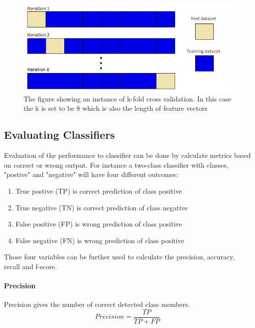 \documentclass[USenglish]{ifimaster}  %
\begin{document}
	
	\begin{figure}[h]
		\centering
		\includegraphics[scale=0.6]{Figures/Kfold}
		\caption{The figure showing an instance of k-fold cross validation. In this case the k is set to be 8 which is also the length of feature vectors}
		\label{fig:kfold}
	\end{figure}
	
	
	
	\subsection{Evaluating Classifiers}\label{subsec:evalclf}
	Evaluation of the performance to classifier can be done by calculate metrics based on correct or wrong output. For instance a two-class classifier with classes, "postive" and "negative" will have four different outcomes:
	
	\begin{enumerate}
		\item True postive (TP) is correct prediction of class positive
		\item True negative (TN) is correct prediction of class negative
		\item False positive (FP) is wrong prediction of class positive
		\item False negative (FN) is wrong prediction of class positive
	\end{enumerate}
	
	Those four variables can be further used to calculate the precision, accuracy, recall and f-score.
	
	\paragraph{Precision}
	Precision gives the number of correct detected class members.
	\begin{equation}
	Precision = \frac{TP}{TP + FP}
	\label{eq:prec}
	\end{equation}
	
\end{document}
